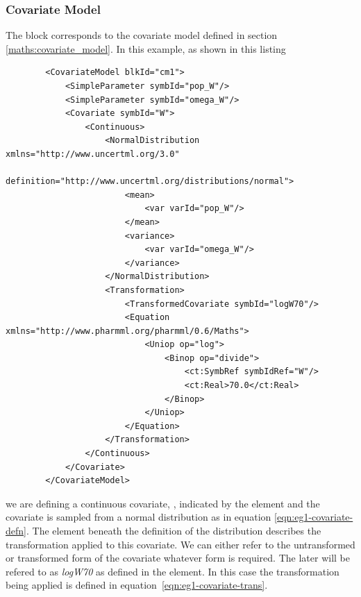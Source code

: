 \subsubsection{Covariate Model}
\label{sec:eg1-covariate}


The  block corresponds to the covariate model
defined in section \ref{maths:covariate_model}. In this example, as shown
in this listing 
\lstset{language=XML}
\begin{lstlisting}
        <CovariateModel blkId="cm1">
            <SimpleParameter symbId="pop_W"/>
            <SimpleParameter symbId="omega_W"/>
            <Covariate symbId="W">
                <Continuous>
                    <NormalDistribution xmlns="http://www.uncertml.org/3.0" 
                    		definition="http://www.uncertml.org/distributions/normal">
                        <mean>
                            <var varId="pop_W"/>
                        </mean>
                        <variance>
                            <var varId="omega_W"/>
                        </variance>
                    </NormalDistribution>
                    <Transformation>
                        <TransformedCovariate symbId="logW70"/>
                        <Equation xmlns="http://www.pharmml.org/pharmml/0.6/Maths">
                            <Uniop op="log">
                                <Binop op="divide">
                                    <ct:SymbRef symbIdRef="W"/>
                                    <ct:Real>70.0</ct:Real>
                                </Binop>
                            </Uniop>
                        </Equation>
                    </Transformation>
                </Continuous>
            </Covariate>
        </CovariateModel>
\end{lstlisting}
we are defining a continuous covariate, , indicated by the 
 element and the covariate is sampled from a 
normal distribution as in equation \ref{eqn:eg1-covariate-defn}.  
The element  beneath the definition of the 
distribution describes the transformation applied to this covariate. 
We can either refer to the untransformed or transformed form of the 
covariate whatever form is required. The later will be refered to as 
\emph{logW70} as defined in the  element. 
In this case the transformation being 
applied is defined in equation~\ref{eqn:eg1-covariate-trans}.


